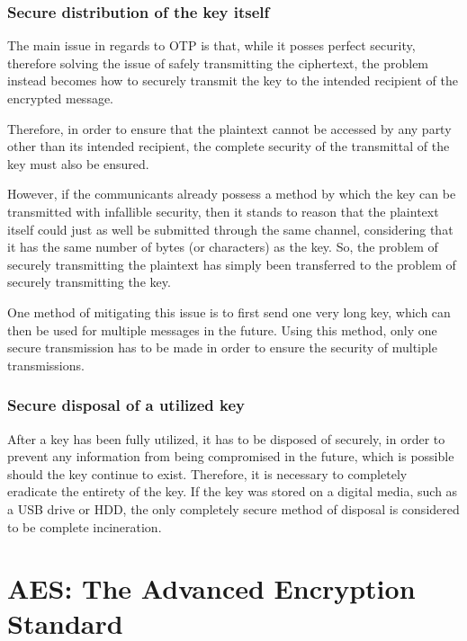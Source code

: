 \documentclass[12pt]{report}
\theoremstyle{definition}
\theoremstyle{remark}
\begin{document}
\subsection{Secure distribution of the key itself}
The main issue in regards to OTP is that, while it posses perfect security, therefore solving the issue of safely transmitting the ciphertext, the problem instead becomes how to securely transmit the key to the intended recipient of the encrypted message.

Therefore, in order to ensure that the plaintext cannot be accessed by any party other than its intended recipient, the complete security of the transmittal of the key must also be ensured.

However, if the communicants already possess a method by which the key can be transmitted with infallible security, then it stands to reason that the plaintext itself could just as well be submitted through the same channel, considering that it has the same number of bytes (or characters) as the key. So, the problem of securely transmitting the plaintext has simply been transferred to the problem of securely transmitting the key.

One method of mitigating this issue is to first send one very long key, which can then be used for multiple messages in the future. Using this method, only one secure transmission has to be made in order to ensure the security of multiple transmissions. 

\subsection{Secure disposal of a utilized key}
After a key has been fully utilized, it has to be disposed of securely, in order to prevent any information from being compromised in the future, which is possible should the key continue to exist. Therefore, it is necessary to completely eradicate the entirety of the key. If the key was stored on a digital media, such as a USB drive or HDD, the only completely secure method of disposal is considered to be complete incineration.


\chapter{AES: The Advanced Encryption Standard}
\end{document}
